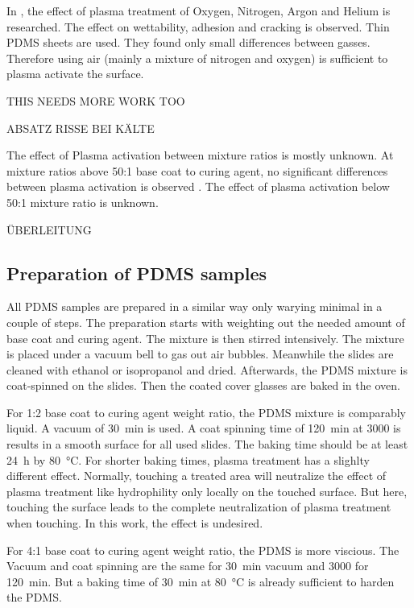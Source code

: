 In \cite{Owen.1994}, the effect of plasma treatment of Oxygen, Nitrogen, Argon and Helium is researched. The effect on wettability, adhesion and cracking is observed. Thin PDMS sheets are used. They found only small differences between gasses. Therefore using air (mainly a mixture of nitrogen and oxygen) is sufficient to plasma activate the surface.

THIS NEEDS MORE WORK TOO

ABSATZ RISSE BEI KÄLTE

The effect of Plasma activation between mixture ratios is mostly unknown. At mixture ratios above 50:1 base coat to curing agent, no significant differences between plasma activation is observed \cite{Ohishi.2017}. The effect of plasma activation below 50:1 mixture ratio is unknown. 

ÜBERLEITUNG

\subsection{Preparation of PDMS samples}

All PDMS samples are prepared in a similar way only warying minimal in a couple of steps. The preparation starts with weighting out the needed amount of base coat and curing agent. The mixture is then stirred intensively. The mixture is placed under a vacuum bell to gas out air bubbles. Meanwhile the slides are cleaned with ethanol or isopropanol and dried. Afterwards, the PDMS mixture is coat-spinned on the slides. Then the coated cover glasses are baked in the oven.

For 1:2 base coat to curing agent weight ratio, the PDMS mixture is comparably liquid. A vacuum of \SI{30}{\minute} is used. A coat spinning time of \SI{120}{\minute} at \SI{3000}{\rpm} is results in a smooth surface for all used slides. The baking time should be at least \SI{24}{\hour} by \SI{80}{\degreeCelsius}. For shorter baking times, plasma treatment has a slighlty different effect. Normally, touching a treated area will neutralize the effect of plasma treatment like hydrophility only locally on the touched surface. But here, touching the surface leads to the complete neutralization of plasma treatment when touching. In this work, the effect is undesired. 
 
For 4:1 base coat to curing agent weight ratio, the PDMS is more viscious. The Vacuum and coat spinning are the same for \SI{30}{\minute} vacuum and \SI{3000}{\rpm} for \SI{120}{\minute}. But a baking time of \SI{30}{\minute} at \SI{80}{\degreeCelsius} is already sufficient to harden the PDMS. 

